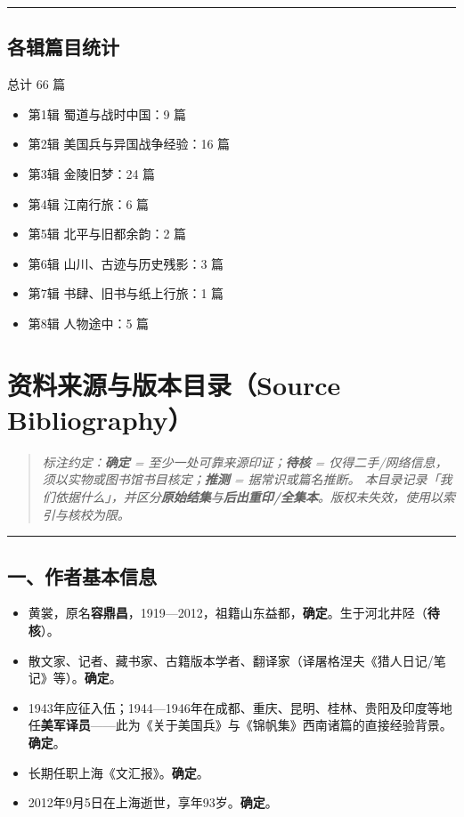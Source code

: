 \documentclass[UTF8,fontset=none,zihao=-4,a4paper]{ctexart}
\begin{document}
\medskip\hrule\medskip

\subsection{各辑篇目统计}


总计 66 篇


\begin{itemize}
\item 第1辑 蜀道与战时中国：9 篇
\item 第2辑 美国兵与异国战争经验：16 篇
\item 第3辑 金陵旧梦：24 篇
\item 第4辑 江南行旅：6 篇
\item 第5辑 北平与旧都余韵：2 篇
\item 第6辑 山川、古迹与历史残影：3 篇
\item 第7辑 书肆、旧书与纸上行旅：1 篇
\item 第8辑 人物途中：5 篇
\end{itemize}


\section{资料来源与版本目录（Source Bibliography）}


\begin{quote}\small\itshape
标注约定：\textbf{确定} = 至少一处可靠来源印证；\textbf{待核} = 仅得二手/网络信息，须以实物或图书馆书目核定；\textbf{推测} = 据常识或篇名推断。 本目录记录「我们依据什么」，并区分\textbf{原始结集}与\textbf{后出重印/全集本}。版权未失效，使用以索引与核校为限。
\end{quote}

\medskip\hrule\medskip

\subsection{一、作者基本信息}


\begin{itemize}
\item 黄裳，原名\textbf{容鼎昌}，1919—2012，祖籍山东益都，\textbf{确定}。生于河北井陉（\textbf{待核}）。
\item 散文家、记者、藏书家、古籍版本学者、翻译家（译屠格涅夫《猎人日记/笔记》等）。\textbf{确定}。
\item 1943年应征入伍；1944—1946年在成都、重庆、昆明、桂林、贵阳及印度等地任\textbf{美军译员}——此为《关于美国兵》与《锦帆集》西南诸篇的直接经验背景。\textbf{确定}。
\item 长期任职上海《文汇报》。\textbf{确定}。
\item 2012年9月5日在上海逝世，享年93岁。\textbf{确定}。
\end{itemize}
\end{document}
